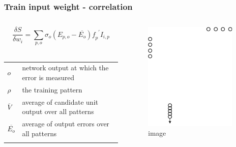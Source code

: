 \documentclass{beamer}
\begin{document}
\begin{frame}
  \frametitle{Train input weight - correlation}
	\begin{columns}[t]
		\begin{column}{0.5\textwidth}
      $$ \frac{\delta S}{\delta w_{i}} = \sum_{p,o} \sigma_{o}(E_{p,o} - \overline{E_{o}}) \mathit{f_{p}}^{\prime} I_{i,p} $$
     \\ 
      \begin{center}
        \begin{tabular}{ll}
          \(\mathit{o}\) & network output at which the error is measured\\
          \(\rho\) & the training pattern\\
          \(\overline{V}\) & average of candidate unit output over all patterns\\
          \(\overline{E_{o}}\) & average of output errors over all patterns\\
          & \\
        \end{tabular}
      \end{center}
		\end{column}
		\begin{column}{0.5\textwidth}
      \begin{figure}
        \centering
        \includegraphics[scale=0.5]{Diagram1.png}
        \caption{image}
      \end{figure}			
		\end{column}
	\end{columns}
\end{frame}
\end{document}
